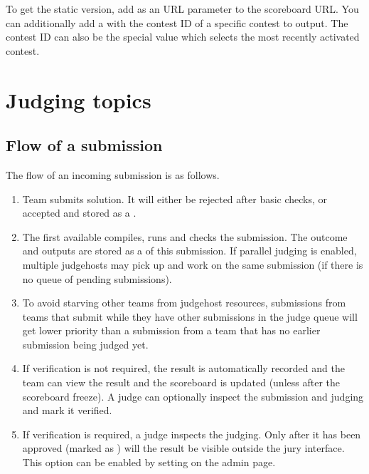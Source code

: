 \documentclass[a4paper,10pt,english,openany]{sphinxmanual}
\begin{document}
\sphinxAtStartPar
To get the static version, add  as an URL parameter to
the  scoreboard URL. You can additionally add a
 with the contest ID of a specific contest to output.
The contest ID can also be the special value  which selects
the most recently activated contest.

\sphinxstepscope


\section{Judging topics}
\label{\detokenize{judging:judging-topics}}\label{\detokenize{judging::doc}}

\subsection{Flow of a submission}
\label{\detokenize{judging:flow-of-a-submission}}
\sphinxAtStartPar
The flow of an incoming submission is as follows.
\begin{enumerate}
%
\item {} 
\sphinxAtStartPar
Team submits solution. It will either be rejected after basic
checks, or accepted and stored as a .

\item {} 
\sphinxAtStartPar
The first available  compiles, runs and checks
the submission. The outcome and outputs are stored as a
 of this submission. If parallel judging is enabled,
multiple judgehosts may pick up and work on the same submission
(if there is no queue of pending submissions).

\item {} 
\sphinxAtStartPar
To avoid starving other teams from judgehost resources,
submissions from teams that submit while they have other submissions
in the judge queue will get lower priority than a submission from a team that has no earlier submission being judged yet.

\item {} 
\sphinxAtStartPar
If verification is not required, the result is automatically
recorded and the team can view the result and the scoreboard is
updated (unless after the scoreboard freeze). A judge can
optionally inspect the submission and judging and mark it
verified.

\item {} 
\sphinxAtStartPar
If verification is required, a judge inspects the judging. Only
after it has been approved (marked as ) will
the result be visible outside the jury interface. This option
can be enabled by setting  on
the  admin page.

\end{enumerate}
\end{document}
